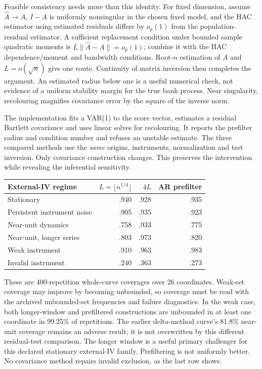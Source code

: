 Feasible consistency needs more than this identity. For fixed dimension,
assume $\hat A\to A$, $I-A$ is uniformly nonsingular in the chosen fixed
model, and the HAC estimator using estimated residuals differs by $o_p(1)$
from the population-residual estimator. A sufficient replacement condition
under bounded sample quadratic moments is
$L\|\hat A-A\|=o_p(1)$; combine it with the HAC dependence/moment and
bandwidth conditions. Root-$n$ estimation of $A$ and $L=o(\sqrt n)$ give
one route. Continuity of matrix inversion then completes the argument.
An estimated radius below one is a useful numerical check, not evidence
of a uniform stability margin for the true bank process. Near singularity,
recolouring magnifies covariance error by the square of the inverse norm.

The implementation fits a VAR(1) to the score vector, estimates a residual
Bartlett covariance and uses linear solves for recolouring. It reports the
prefilter radius and condition number and refuses an unstable estimate.
The three compared methods use the \emph{same} origins, instruments,
normalization and test inversion. Only covariance construction changes.
This preserves the intervention while revealing the inferential sensitivity.

\begin{center}\small
\begin{tabular}{lrrr}\toprule
External-IV regime & $L=\lfloor n^{1/4}\rfloor$ & $4L$ & AR prefilter\\\midrule
Stationary & .940 & .928 & .935\\
Persistent instrument noise & .905 & .935 & .923\\
Near-unit dynamics & .758 & .933 & .775\\
Near-unit, longer series & .803 & .973 & .820\\
Weak instrument & .910 & .963 & .983\\
Invalid instrument & .240 & .363 & .273\\\bottomrule
\end{tabular}\end{center}
These are 400-repetition whole-curve coverages over 26 coordinates. Weak-set
coverage may improve by becoming unbounded, so coverage must be read with
the archived unbounded-set frequencies and failure diagnostics. In the weak
case, both longer-window and prefiltered constructions are unbounded in at
least one coordinate in 99.25\% of repetitions. The earlier
delta-method curve's 81.8\% near-unit coverage remains an adverse result;
it is not overwritten by this different residual-test comparison. The
longer window is a useful primary challenger for this declared stationary
external-IV family. Prefiltering is not uniformly better. No covariance
method repairs invalid exclusion, as the last row shows.

